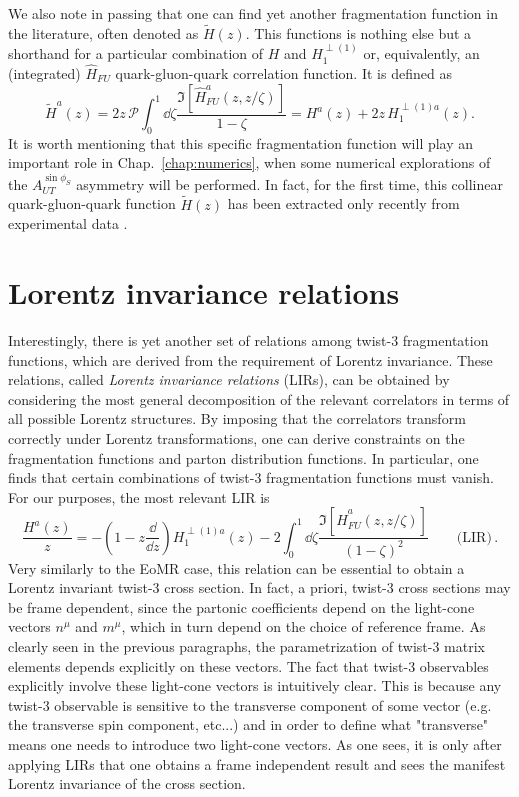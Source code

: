 \noindent We also note in passing that one can find yet another fragmentation function in the literature, often denoted as $\tilde H(z)$. This functions is nothing else but a shorthand for a particular combination of $H$ and $H_1^{\perp(1)}$ or, equivalently, an (integrated) $\hat H_{FU}$ quark-gluon-quark correlation function. It is defined as
\begin{equation}\label{eq:Htildedefinition}
    \tilde{H}^a(z)=2z\,\mathcal{P}\int_0^1\dd \zeta\frac{\Im[\hat H^a_{FU}(z,z/\zeta)]}{1-\zeta}=H^a(z)+2z\,H_1^{\perp(1)a}(z).
\end{equation}
It is worth mentioning that this specific fragmentation function will play an important role in Chap.~\ref{chap:numerics}, when some numerical explorations of the $A_{UT}^{\sin\phi_S}$ asymmetry will be performed. In fact, for the first time, this collinear quark-gluon-quark function $\tilde{H}(z)$ has been extracted only recently from experimental data \cite{Gamberg2022Htilde}.



\section{Lorentz invariance relations}
Interestingly, there is yet another set of relations among twist-3 fragmentation functions, which are derived from the requirement of Lorentz invariance. These relations, called \textit{Lorentz invariance relations} (LIRs), can be obtained by considering the most general decomposition of the relevant correlators in terms of all possible Lorentz structures. By imposing that the correlators transform correctly under Lorentz transformations, one can derive constraints on the fragmentation functions and parton distribution functions. In particular, one finds that certain combinations of twist-3 fragmentation functions must vanish. For our purposes, the most relevant LIR is \cite{kanazawa_operator_2016}
\begin{equation}
    \frac{H^a(z)}{z}=-\left(1-z\frac{\dd}{\dd z}\right)H_1^{\perp(1)a}(z)-2\int_0^1 \dd \zeta\frac{\Im[\hat H^a_{FU}(z,z/\zeta)]}{\left(1-\zeta\right)^2}\qquad \text{(LIR)}\,.
\end{equation}
Very similarly to the EoMR case, this relation can be essential to obtain a Lorentz invariant twist-3 cross section. In fact, a priori, twist-3 cross sections may be frame dependent, since the partonic coefficients depend on the light-cone vectors $n^\mu$ and $m^\mu$, which in turn depend on the choice of reference frame. As clearly seen in the previous paragraphs, the parametrization of twist-3 matrix elements depends explicitly on these vectors. The fact that twist-3 observables explicitly involve these light-cone vectors is intuitively clear. This is because any twist-3 observable is sensitive to the transverse component of some vector (e.g. the transverse spin component, etc...) and in order to define what "transverse" means one needs to introduce two light-cone vectors. As one sees, it is only after applying LIRs that one obtains a frame independent result and sees the manifest Lorentz invariance of the cross section. 
